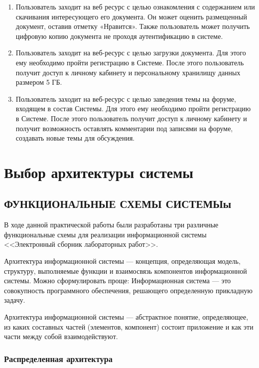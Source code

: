 \documentclass[a4paper,14pt]{extarticle}
\begin{document}
\begin{enumerate}
	\item Пользователь заходит на веб ресурс с целью ознакомления с содержанием или скачивания интересующего его документа. Он может оценить размещенный документ, оставив отметку «Нравится». Также пользователь может получить цифровую копию документа не проходя аутентификацию в системе. 
	\item Пользователь заходит на веб-ресурс с целью загрузки документа. Для этого ему необходимо пройти регистрацию в Системе. После этого пользователь получит доступ к личному кабинету и персональному хранилищу данных размером 5 ГБ.
	\item Пользователь заходит на веб-ресурс с целью заведения темы на форуме, входящем в состав Системы. Для этого ему необходимо пройти регистрацию в Системе. После этого пользователь получит доступ к личному кабинету и получит возможность оставлять комментарии под записями на форуме, создавать новые темы для обсуждения.
\end{enumerate}

\newpage
\section{Выбор архитектуры системы}

\subsection{ФУНКЦИОНАЛЬНЫЕ СХЕМЫ СИСТЕМЫы}
В ходе данной практической работы были разработаны три различные функциональные схемы для реализации информационной системы <<Электронный сборник лабораторных работ>>.


Архитектура информационной системы --- концепция,
определяющая модель, структуру, выполняемые функции и
взаимосвязь компонентов информационной системы.
Можно сформулировать проще:
Информационная система --- это совокупность программного
обеспечения, решающего определенную прикладную задачу.


Архитектура информационной системы --- абстрактное
понятие, определяющее, из каких составных частей (элементов,
компонент) состоит приложение и как эти части между собой
взаимодействуют.



\subsubsection{Распределенная архитектура}
\end{document}
